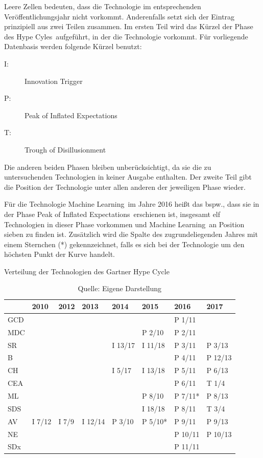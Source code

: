 Leere Zellen bedeuten, dass die Technologie im entsprechenden Veröffentlichungsjahr nicht vorkommt. Anderenfalls setzt sich der Eintrag prinzipiell aus zwei Teilen zusammen. Im ersten Teil wird das Kürzel der Phase des \glqq Hype Cyles\grqq~aufgeführt, in der die Technologie vorkommt. Für vorliegende Datenbasis werden folgende Kürzel benutzt:

\begin{description}
	\item[I:] Innovation Trigger
	\item[P:] Peak of Inflated Expectations
	\item[T:] Trough of Disillusionment
\end{description}

Die anderen beiden Phasen bleiben unberücksichtigt, da sie die zu untersuchenden Technologien in keiner Ausgabe enthalten. Der zweite Teil gibt die Position der Technologie unter allen anderen der jeweiligen Phase wieder.

Für die Technologie \glqq Machine Learning\grqq~im Jahre 2016 heißt das bspw., dass sie in der Phase \glqq Peak of Inflated Expectations\grqq~erschienen ist, insgesamt elf Technologien in dieser Phase vorkommen und \glqq Machine Learning\grqq~an Position sieben zu finden ist. Zusätzlich wird die Spalte des zugrundeliegenden Jahres mit einem Sternchen (*) gekennzeichnet, falls es sich bei der Technologie um den höchsten Punkt der Kurve handelt.

\begin{table}
	\caption{Verteilung der Technologien des \glqq Gartner Hype Cycle\grqq}
	\centering
	\label{tab:dist_ghc}
\begin{tabularx}{\linewidth}{X|XXXXXXX}
	& 2010 & 2012 & 2013 & 2014 & 2015 & 2016 & 2017 \\
	\hline
	GCD &  &  &  &  &  & P 1/11 &  \\
	\hline
	MDC &  &  &  &  & P 2/10 & P 2/11 &  \\
	\hline
	SR &  &  &  & I 13/17 & I 11/18 & P 3/11 & P 3/13 \\
	\hline
	B &  &  &  &  &  & P 4/11 & P 12/13 \\
	\hline
	CH &  &  &  & I 5/17 & I 13/18 & P 5/11 & P 6/13 \\
	\hline
	CEA &  &  &  &  &  & P 6/11 & T 1/4 \\
	\hline
	ML &  &  &  &  & P 8/10 & P 7/11* & P 8/13 \\
	\hline
	SDS &  &  &  &  & I 18/18 & P 8/11 & T 3/4 \\
	\hline
	AV & I 7/12 & I 7/9 & I 12/14 & P 3/10 & P 5/10* & P 9/11 & P 9/13 \\
	\hline
	NE &  &  &  &  &  & P 10/11 & P 10/13 \\
	\hline
	SDx &  &  &  &  &  & P 11/11 &  \\
\end{tabularx}
\caption*{Quelle: Eigene Darstellung}
\end{table}

